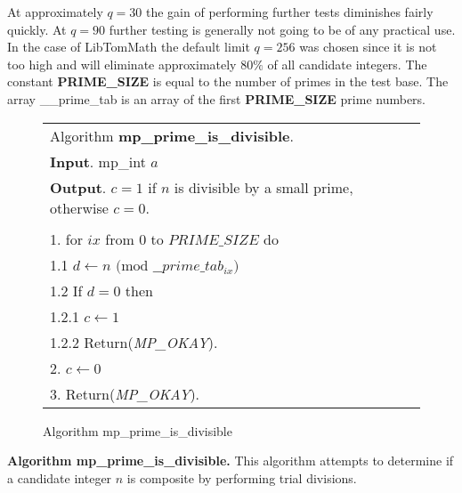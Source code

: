 \documentclass[b5paper]{book}
\begin{document}
At approximately $q = 30$ the gain of performing further tests diminishes fairly quickly.  At $q = 90$ further testing is generally not going to 
be of any practical use.  In the case of LibTomMath the default limit $q = 256$ was chosen since it is not too high and will eliminate 
approximately $80\%$ of all candidate integers.  The constant \textbf{PRIME\_SIZE} is equal to the number of primes in the test base.  The 
array \_\_prime\_tab is an array of the first \textbf{PRIME\_SIZE} prime numbers.  

\begin{figure}[!here]
\begin{small}
\begin{center}
\begin{tabular}{l}
\hline Algorithm \textbf{mp\_prime\_is\_divisible}. \\
\textbf{Input}.   mp\_int $a$ \\
\textbf{Output}.  $c = 1$ if $n$ is divisible by a small prime, otherwise $c = 0$.  \\
\hline \\
1.  for $ix$ from $0$ to $PRIME\_SIZE$ do \\
\hspace{3mm}1.1  $d \leftarrow n \mbox{ (mod }\_\_prime\_tab_{ix}\mbox{)}$ \\
\hspace{3mm}1.2  If $d = 0$ then \\
\hspace{6mm}1.2.1  $c \leftarrow 1$ \\
\hspace{6mm}1.2.2  Return(\textit{MP\_OKAY}). \\
2.  $c \leftarrow 0$ \\
3.  Return(\textit{MP\_OKAY}). \\
\hline
\end{tabular}
\end{center}
\end{small}
\caption{Algorithm mp\_prime\_is\_divisible}
\end{figure}
\textbf{Algorithm mp\_prime\_is\_divisible.}
This algorithm attempts to determine if a candidate integer $n$ is composite by performing trial divisions.  
\end{document}
